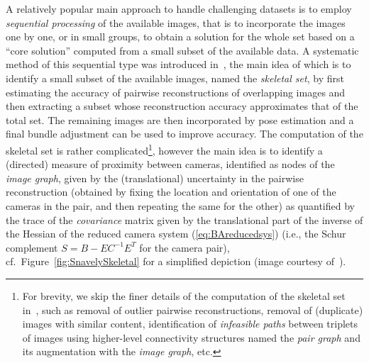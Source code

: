 \documentclass[10pt]{article}
\begin{document}
A relatively popular main approach to handle challenging datasets is to employ \textit{sequential processing} of the available images, that is to incorporate the images one by one, or in small groups, to obtain a solution for the whole set based on a ``core solution'' computed from a small subset of the available data. A systematic method of this sequential type was introduced in~\cite{SnavelySkeletal}, the main idea of which is to identify a small subset of the available images, named the \textit{skeletal set}, by first estimating the accuracy of pairwise reconstructions of overlapping images and then extracting a subset whose reconstruction accuracy approximates that of the total set. The remaining images are then incorporated by pose estimation and a final bundle adjustment can be used to improve accuracy. The computation of the skeletal set is rather complicated\footnote{For brevity, we skip the finer details of the computation of the skeletal set in~\cite{SnavelySkeletal}, such as removal of outlier pairwise reconstructions, removal of (duplicate) images with similar content, identification of \textit{infeasible paths} between triplets of images using higher-level connectivity structures named the \textit{pair graph} and its augmentation with the \textit{image graph}, etc.}, however the main idea is to identify a (directed) measure of proximity between cameras, identified as nodes of the \textit{image graph}, given by the (translational) uncertainty in the pairwise reconstruction (obtained by fixing the location and orientation of one of the cameras in the pair, and then repeating the same for the other) as quantified by the trace of the \textit{covariance} matrix given by the translational part of the inverse of the Hessian of the reduced camera system (\ref{eq:BAreducedsys}) (i.e., the Schur complement $S = B-EC^{-1}E^T$ for the camera pair), cf.~Figure~\ref{fig:SnavelySkeletal} for a simplified depiction (image courtesy of~\cite{SnavelySkeletal}).
\end{document}
